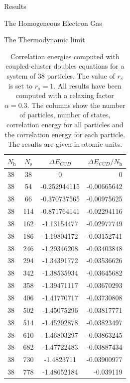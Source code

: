 \documentclass[twoside,english]{uiofysmaster}
\begin{document}
\begin{chapter}{Results}
\begin{section}{The Homogeneous Electron Gas}
\begin{subsection}{The Thermodynamic limit}
			\begin{table}[H]
				\begin{center}
					\begin{tabular}[center]{l c  c r}
						$N_{\text{h}}$ & $N_{\text{s}}$ & $\Delta E_{CCD}$ & $\Delta E_{CCD}/N_{\text{h}}$ \\
						\hline
						38 &  38 & 0 &0 \\
						38 &  54 & -0.252944115 & -0.00665642\\
						38 &  66 & -0.370737565 & -0.00975625\\
						38 & 114 & -0.871764141 & -0.02294116\\
						38 & 162 & -1.13154477  & -0.02977749\\
						38 & 186 & -1.19804172  & -0.03152741\\
						38 & 246 & -1.29346208  & -0.03403848\\
						38 & 294 & -1.34391772  & -0.03536626\\
						38 & 342 & -1.38535934  & -0.03645682\\
						38 & 358 & -1.39471117  & -0.03670293\\
						38 & 406 & -1.41770717  & -0.03730808\\
						38 & 502 & -1.45075296  & -0.03817771\\
						38 & 514 & -1.45292878  & -0.03823497\\
						38 & 610 & -1.46803297  & -0.03863245\\
						38 & 682 & -1.47722483  & -0.03887434 \\
						38 & 730 & -1.4823711   & -0.03900977\\
						38 & 778 & -1.48652184  & -0.039119
					\end{tabular}
				\end{center}
				\caption{Correlation energies computed with coupled-cluster doubles equations for a system of $38$ particles. The value of $r_s$ is set to $r_s=1$. All results have been computed with a relaxing factor $\alpha=0.3$. The columns show the number of particles, number of states, correlation energy for all particles and the correlation energy for each particle. The results are given in atomic units.}
				\label{table:ThermodynamicLimit2}
			\end{table}


\end{subsection}
\end{section}
\end{chapter}
\end{document}
